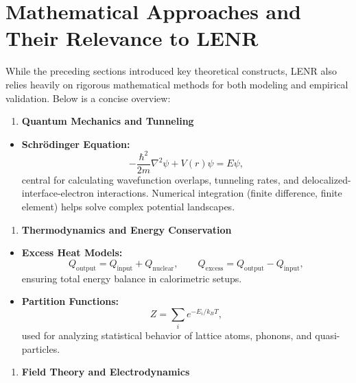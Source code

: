 \documentclass[11pt,a4paper]{article}
\begin{document}
\section{Mathematical Approaches and Their Relevance to LENR}

While the preceding sections introduced key theoretical constructs, LENR also relies heavily on rigorous mathematical methods for both modeling and empirical validation. Below is a concise overview:

\begin{enumerate}
\def\labelenumi{\arabic{enumi}.}
\item
  \textbf{Quantum Mechanics and Tunneling}
\end{enumerate}

\begin{itemize}
\item
  \textbf{Schr\"{o}dinger Equation:} \begin{equation}
-\frac{\hbar^2}{2m}\nabla^2\psi + V(r)\psi = E\psi,
\end{equation} central for calculating wavefunction overlaps, tunneling rates, and delocalized-interface-electron interactions. Numerical integration (finite difference, finite element) helps solve complex potential landscapes.
\end{itemize}

\begin{enumerate}
\def\labelenumi{\arabic{enumi}.}
\setcounter{enumi}{1}
\item
  \textbf{Thermodynamics and Energy Conservation}
\end{enumerate}

\begin{itemize}
\item
  \textbf{Excess Heat Models:} \begin{equation}
Q_{\text{output}} = Q_{\text{input}} + Q_{\text{nuclear}}, \qquad Q_{\text{excess}} = Q_{\text{output}} - Q_{\text{input}},
\end{equation} ensuring total energy balance in calorimetric setups.
\item
  \textbf{Partition Functions:} \begin{equation}
Z = \sum_i e^{-E_i/k_B T},
\end{equation} used for analyzing statistical behavior of lattice atoms, phonons, and quasi-particles.
\end{itemize}

\begin{enumerate}
\def\labelenumi{\arabic{enumi}.}
\setcounter{enumi}{2}
\item
  \textbf{Field Theory and Electrodynamics}
\end{enumerate}
\end{document}
